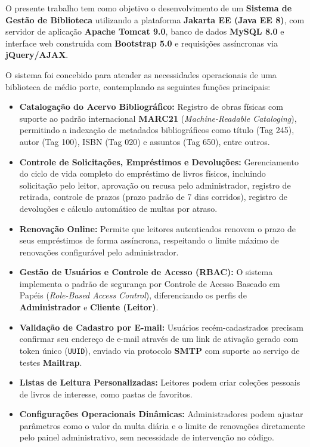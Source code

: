 O presente trabalho tem como objetivo o desenvolvimento de um \textbf{Sistema de Gestão de Biblioteca} utilizando a plataforma \textbf{Jakarta EE (Java EE 8)}, com servidor de aplicação \textbf{Apache Tomcat 9.0}, banco de dados \textbf{MySQL 8.0} e interface web construída com \textbf{Bootstrap 5.0} e requisições assíncronas via \textbf{jQuery/AJAX}.

O sistema foi concebido para atender as necessidades operacionais de uma biblioteca de médio porte, contemplando as seguintes funções principais:

\begin{itemize}
    \item \textbf{Catalogação do Acervo Bibliográfico:} Registro de obras físicas com suporte ao padrão internacional \textbf{MARC21} (\textit{Machine-Readable Cataloging}), permitindo a indexação de metadados bibliográficos como título (Tag 245), autor (Tag 100), ISBN (Tag 020) e assuntos (Tag 650), entre outros.
    
    \item \textbf{Controle de Solicitações, Empréstimos e Devoluções:} Gerenciamento do ciclo de vida completo do empréstimo de livros físicos, incluindo solicitação pelo leitor, aprovação ou recusa pelo administrador, registro de retirada, controle de prazos (prazo padrão de 7 dias corridos), registro de devoluções e cálculo automático de multas por atraso.
    
    \item \textbf{Renovação Online:} Permite que leitores autenticados renovem o prazo de seus empréstimos de forma assíncrona, respeitando o limite máximo de renovações configurável pelo administrador.
    
    \item \textbf{Gestão de Usuários e Controle de Acesso (RBAC):} O sistema implementa o padrão de segurança por Controle de Acesso Baseado em Papéis (\textit{Role-Based Access Control}), diferenciando os perfis de \textbf{Administrador} e \textbf{Cliente (Leitor)}.
    
    \item \textbf{Validação de Cadastro por E-mail:} Usuários recém-cadastrados precisam confirmar seu endereço de e-mail através de um link de ativação gerado com token único (\texttt{UUID}), enviado via protocolo \textbf{SMTP} com suporte ao serviço de testes \textbf{Mailtrap}.
    
    \item \textbf{Listas de Leitura Personalizadas:} Leitores podem criar coleções pessoais de livros de interesse, como pastas de favoritos.
    
    \item \textbf{Configurações Operacionais Dinâmicas:} Administradores podem ajustar parâmetros como o valor da multa diária e o limite de renovações diretamente pelo painel administrativo, sem necessidade de intervenção no código.
\end{itemize}

